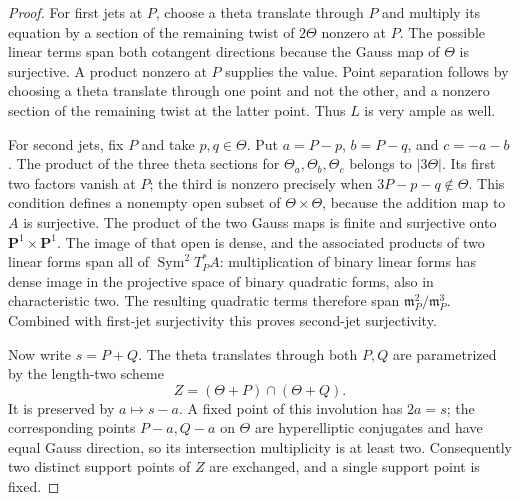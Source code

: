 \begin{proof}
For first jets at $P$, choose a theta translate through $P$ and
multiply its equation by a section of the remaining twist of
$2\Theta$ nonzero at $P$. The possible linear terms span both
cotangent directions because the Gauss map of $\Theta$ is
surjective. A product nonzero at $P$ supplies the value. Point
separation follows by choosing a theta translate through one point
and not the other, and a nonzero section of the remaining twist
at the latter point. Thus $L$ is very ample as well.

For second jets, fix $P$ and take $p,q\in\Theta$. Put
$a=P-p$, $b=P-q$, and $c=-a-b$. The product of the three theta
sections for $\Theta_a,\Theta_b,\Theta_c$ belongs to $|3\Theta|$.
Its first two factors vanish at $P$; the third is nonzero precisely
when $3P-p-q\notin\Theta$. This condition defines a nonempty open
subset of $\Theta\times\Theta$, because the addition map to $A$
is surjective. The product of the two Gauss maps is finite and
surjective onto $\mathbf P^1\times\mathbf P^1$. The image of that
open is dense, and the associated products of two linear forms
span all of $\operatorname{Sym}^2T_P^*A$: multiplication of binary
linear forms has dense image in the projective space of binary
quadratic forms, also in characteristic two. The resulting
quadratic terms therefore span
$\mathfrak m_P^2/\mathfrak m_P^3$. Combined with first-jet
surjectivity this proves second-jet surjectivity.

Now write $s=P+Q$. The theta translates through both $P,Q$ are
parametrized by the length-two scheme
\[
                      Z=(\Theta+P)\cap(\Theta+Q).
\]
It is preserved by $a\mapsto s-a$. A fixed point of this involution
has $2a=s$; the corresponding points $P-a,Q-a$ on $\Theta$ are
hyperelliptic conjugates and have equal Gauss direction, so its
intersection multiplicity is at least two. Consequently two
distinct support points of $Z$ are exchanged, and a single support
point is fixed.


\end{proof}
